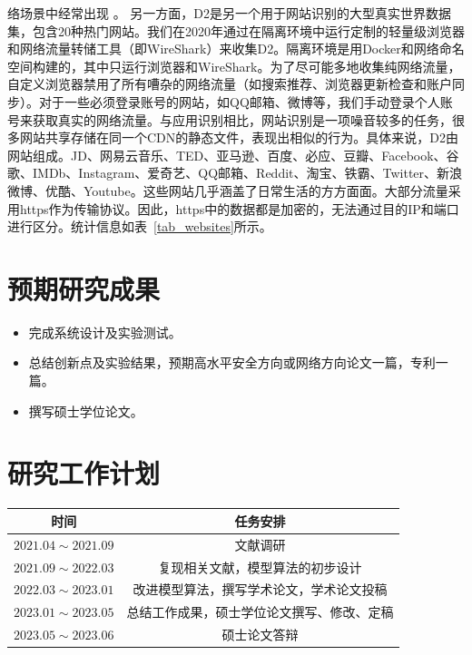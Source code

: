 \documentclass[degree=master,cjk-font=noto]{thuthesis}
\begin{document}
络场景中经常出现 。
另一方面，D2是另一个用于网站识别的大型真实世界数据集，包含20种热门网站。我们在2020年通过在隔离环境中运行定制的轻量级浏览器和网络流量转储工具（即WireShark）来收集D2。隔离环境是用Docker和网络命名空间构建的，其中只运行浏览器和WireShark。为了尽可能多地收集纯网络流量，自定义浏览器禁用了所有嘈杂的网络流量（如搜索推荐、浏览器更新检查和账户同步）。对于一些必须登录账号的网站，如QQ邮箱、微博等，我们手动登录个人账号来获取真实的网络流量。与应用识别相比，网站识别是一项噪音较多的任务，很多网站共享存储在同一个CDN的静态文件，表现出相似的行为。具体来说，D2由网站组成。JD、网易云音乐、TED、亚马逊、百度、必应、豆瓣、Facebook、谷歌、IMDb、Instagram、爱奇艺、QQ邮箱、Reddit、淘宝、铁霸、Twitter、新浪微博、优酷、Youtube。这些网站几乎涵盖了日常生活的方方面面。大部分流量采用https作为传输协议。因此，https中的数据都是加密的，无法通过目的IP和端口进行区分。统计信息如表~\ref{tab_websites}所示。



\chapter{预期研究成果}

\begin{itemize}
	\item 完成系统设计及实验测试。
	\item 总结创新点及实验结果，预期高水平安全方向或网络方向论文一篇，专利一篇。
	\item 撰写硕士学位论文。
\end{itemize}

\chapter{研究工作计划}


\begin{table}[htb]
  \centering
  \label{tab:plan}
  \begin{tabular}{cc}
    \toprule
    \textbf{时间}         & \textbf{任务安排}  \\
    \midrule
    $2021.04 \sim 2021.09$ & 文献调研 \\
    $2021.09 \sim 2022.03$ & 复现相关文献，模型算法的初步设计 \\
    $2022.03 \sim 2023.01$ & 改进模型算法，撰写学术论文，学术论文投稿 \\
    $2023.01 \sim 2023.05$ & 总结工作成果，硕士学位论文撰写、修改、定稿\\
    $2023.05 \sim 2023.06$ & 硕士论文答辩 \\
    \bottomrule
  \end{tabular}
\end{table}

\backmatter


\appendix
\end{document}
